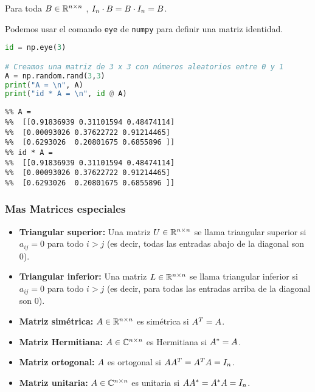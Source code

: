 \begin{proposicion}
Para toda $\Bb \in \R^{n \times n}$ , $I_n \cdot \Bb = \Bb \cdot I_n = \Bb$.
\end{proposicion}

Podemos usar el comando \texttt{eye} de \texttt{numpy} para definir una matriz identidad.

\begin{Shaded}
\begin{lstlisting}[language=Python]
id = np.eye(3)

# Creamos una matriz de 3 x 3 con números aleatorios entre 0 y 1
A = np.random.rand(3,3)
print("A = \n", A)
print("id * A = \n", id @ A)
\end{lstlisting}
\end{Shaded}

\begin{verbatim}
%% A =
%%  [[0.91836939 0.31101594 0.48474114]
%%  [0.00093026 0.37622722 0.91214465]
%%  [0.6293026  0.20801675 0.6855896 ]]
%% id * A =
%%  [[0.91836939 0.31101594 0.48474114]
%%  [0.00093026 0.37622722 0.91214465]
%%  [0.6293026  0.20801675 0.6855896 ]]
\end{verbatim}

\subsubsection{Mas Matrices especiales}

\begin{itemize}
\item \textbf{Triangular superior:} Una matriz $\Ub \in \R^{n \times n}$ se llama triangular superior si $a_{ij} = 0$ para todo $i > j$ (es decir, todas las entradas abajo de la diagonal son 0).
\item \textbf{Triangular inferior:} Una matriz $\Lb \in \R^{n \times n}$ se llama triangular inferior si $a_{ij} = 0$ para todo $i > j$ (es decir, para todas las entradas arriba de la diagonal son 0).
\item \textbf{Matriz simétrica:} $\Ab\in \R^{n\times n}$ es simétrica si $\Ab^T = \Ab$.
\item \textbf{Matriz Hermitiana:} $\Ab\in \C^{n\times n}$ es Hermitiana si $\Ab^* = \Ab$.
\item \textbf{Matriz ortogonal:} $\Ab$ es ortogonal si $\Ab\Ab^T = \Ab^T\Ab = \Id_n$.
\item \textbf{Matriz unitaria:} $\Ab\in \C^{n\times n}$ es unitaria si $\Ab\Ab^* = \Ab^*\Ab = \Id_n$.
\end{itemize}

